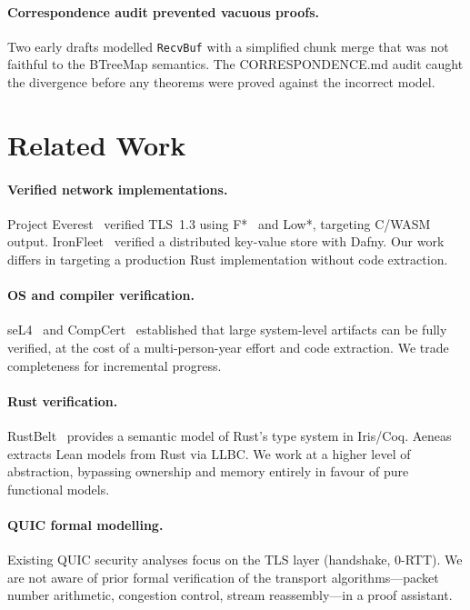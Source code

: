 \documentclass[sigconf,10pt]{acmart}
\begin{document}
\paragraph{Correspondence audit prevented vacuous proofs.}
Two early drafts modelled \texttt{RecvBuf} with a simplified chunk merge
that was not faithful to the BTreeMap semantics.
The CORRESPONDENCE.md audit caught the divergence before any theorems
were proved against the incorrect model.

\section{Related Work}
\label{sec:related}

\paragraph{Verified network implementations.}
Project Everest~\cite{everest} verified TLS~1.3 using F*~\cite{fstar-tls}
and Low*, targeting C/WASM output.
IronFleet~\cite{ironfleet} verified a distributed key-value store with
Dafny.
Our work differs in targeting a production Rust implementation without
code extraction.

\paragraph{OS and compiler verification.}
seL4~\cite{sel4} and CompCert~\cite{compcert} established that large
system-level artifacts can be fully verified, at the cost of a
multi-person-year effort and code extraction.
We trade completeness for incremental progress.

\paragraph{Rust verification.}
RustBelt~\cite{rustbelt} provides a semantic model of Rust's type system
in Iris/Coq.
Aeneas~\cite{aeneas} extracts Lean models from Rust via LLBC.
We work at a higher level of abstraction, bypassing ownership and memory
entirely in favour of pure functional models.

\paragraph{QUIC formal modelling.}
Existing QUIC security analyses focus on the TLS layer
(handshake, 0-RTT).
We are not aware of prior formal verification of the transport
algorithms---packet number arithmetic, congestion control, stream
reassembly---in a proof assistant.
\end{document}
